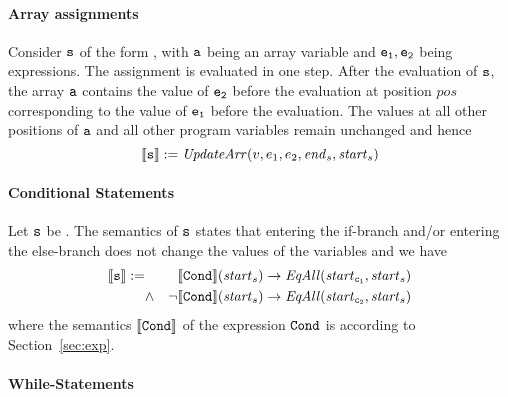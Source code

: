 \paragraph{Array assignments}
Consider $\texttt{s}$ of the form ,
with $\texttt{a}$ being an array variable and
$\texttt{e$\mathtt{_{1}}$}, \texttt{e$\mathtt{_{2}}$}$ being expressions.
The assignment is evaluated in one step. 
After the evaluation of $\texttt{s}$, the array $\texttt{a}$ contains the
value of $\texttt{e$\mathtt{_{2}}$}$ before the evaluation at position
$\mathit{pos}$ corresponding to the value of $\texttt{e$\mathtt{_{1}}$}$ before
the evaluation. The values at all other positions of $\texttt{a}$ and all
other program variables remain unchanged and hence 
%
\begin{equation}\label{semantics_arr_assign}
\llbracket \texttt{s}\rrbracket := \mathit{UpdateArr}(v,e_1,e_2,\mathit{end}_s,\mathit{start}_s)
\end{equation}

\paragraph{Conditional \ifThenElseStatement{} Statements}
Let $\texttt{s}$ be .
The semantics of $\texttt{s}$ states that entering the if-branch and/or entering the else-branch 
does not change the values of the variables and we have 
\begin{subequations}
	\begin{align}
	\label{semantics_ite_1}
	\llbracket \texttt{s} \rrbracket := 
	&		    && \llbracket \texttt{Cond} \rrbracket (\mathit{start}_s) \rightarrow \mathit{EqAll}(\mathit{start}_{\texttt{c$\mathtt{_{1}}$}},\mathit{start}_s)\\
	\label{semantics_ite_2}
	&\land	&\neg&\llbracket \texttt{Cond} \rrbracket (\mathit{start}_s) \rightarrow \mathit{EqAll}(\mathit{start}_{\texttt{c$\mathtt{_{2}}$}},\mathit{start}_s)
	\end{align}
\end{subequations}
where the semantics
$\llbracket \texttt{Cond} \rrbracket$ of the expression $\texttt{Cond}$ is according
to Section~\ref{sec:exp}. 

\paragraph{While-Statements}

